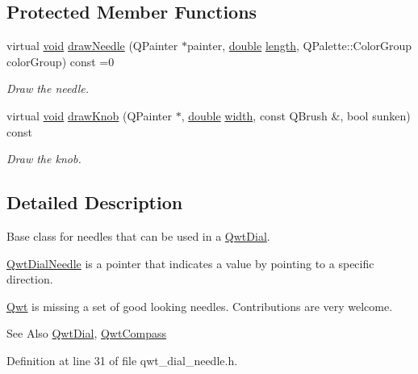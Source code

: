 \subsection*{Protected Member Functions}
\begin{DoxyCompactItemize}
\item 
virtual \hyperlink{group___u_a_v_objects_plugin_ga444cf2ff3f0ecbe028adce838d373f5c}{void} \hyperlink{class_qwt_dial_needle_a1e4fee366fec1838edc18890d9957f2b}{draw\-Needle} (Q\-Painter $\ast$painter, \hyperlink{_super_l_u_support_8h_a8956b2b9f49bf918deed98379d159ca7}{double} \hyperlink{glext_8h_a3c8469415bbc83dd1341af15c67f1cef}{length}, Q\-Palette\-::\-Color\-Group color\-Group) const =0
\begin{DoxyCompactList}\small\item\em Draw the needle. \end{DoxyCompactList}\item 
virtual \hyperlink{group___u_a_v_objects_plugin_ga444cf2ff3f0ecbe028adce838d373f5c}{void} \hyperlink{class_qwt_dial_needle_aaca9572717a1db10b1b6609571024688}{draw\-Knob} (Q\-Painter $\ast$, \hyperlink{_super_l_u_support_8h_a8956b2b9f49bf918deed98379d159ca7}{double} \hyperlink{glext_8h_a76aaa5c50746272e7d2de9aece921757}{width}, const Q\-Brush \&, bool sunken) const 
\begin{DoxyCompactList}\small\item\em Draw the knob. \end{DoxyCompactList}\end{DoxyCompactItemize}


\subsection{Detailed Description}
Base class for needles that can be used in a \hyperlink{class_qwt_dial}{Qwt\-Dial}. 

\hyperlink{class_qwt_dial_needle}{Qwt\-Dial\-Needle} is a pointer that indicates a value by pointing to a specific direction.

\hyperlink{namespace_qwt}{Qwt} is missing a set of good looking needles. Contributions are very welcome.

\begin{DoxySeeAlso}{See Also}
\hyperlink{class_qwt_dial}{Qwt\-Dial}, \hyperlink{class_qwt_compass}{Qwt\-Compass} 
\end{DoxySeeAlso}


Definition at line 31 of file qwt\-\_\-dial\-\_\-needle.\-h.



